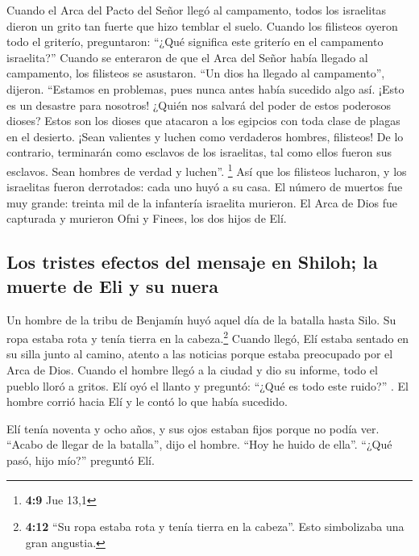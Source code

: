  Cuando el Arca del Pacto del Señor llegó al campamento,
todos los israelitas dieron un grito tan fuerte que hizo temblar el
suelo.  Cuando los filisteos oyeron todo el griterío,
preguntaron: ``¿Qué significa este griterío en el campamento
israelita?'' Cuando se enteraron de que el Arca del Señor había llegado
al campamento,  los filisteos se asustaron. ``Un dios ha
llegado al campamento'', dijeron. ``Estamos en problemas, pues nunca
antes había sucedido algo así.  ¡Esto es un desastre para
nosotros! ¿Quién nos salvará del poder de estos poderosos dioses? Estos
son los dioses que atacaron a los egipcios con toda clase de plagas en
el desierto.  ¡Sean valientes y luchen como verdaderos
hombres, filisteos! De lo contrario, terminarán como esclavos de los
israelitas, tal como ellos fueron sus esclavos. Sean hombres de verdad y
luchen''. \footnote{\textbf{4:9} Jue 13,1}  Así que los
filisteos lucharon, y los israelitas fueron derrotados: cada uno huyó a
su casa. El número de muertos fue muy grande: treinta mil de la
infantería israelita murieron.  El Arca de Dios fue
capturada y murieron Ofni y Finees, los dos hijos de Elí.

\hypertarget{los-tristes-efectos-del-mensaje-en-shiloh-la-muerte-de-eli-y-su-nuera}{%
\subsection{Los tristes efectos del mensaje en Shiloh; la muerte de Eli
y su
nuera}\label{los-tristes-efectos-del-mensaje-en-shiloh-la-muerte-de-eli-y-su-nuera}}

 Un hombre de la tribu de Benjamín huyó aquel día de la
batalla hasta Silo. Su ropa estaba rota y tenía tierra en la
cabeza.\footnote{\textbf{4:12} ``Su ropa estaba rota y tenía tierra en
  la cabeza''. Esto simbolizaba una gran angustia.} 
Cuando llegó, Elí estaba sentado en su silla junto al camino, atento a
las noticias porque estaba preocupado por el Arca de Dios. Cuando el
hombre llegó a la ciudad y dio su informe, todo el pueblo lloró a
gritos.  Elí oyó el llanto y preguntó: ``¿Qué es todo
este ruido?'' . El hombre corrió hacia Elí y le contó lo que había
sucedido.

 Elí tenía noventa y ocho años, y sus ojos estaban fijos
porque no podía ver.  ``Acabo de llegar de la batalla'',
dijo el hombre. ``Hoy he huido de ella''. ``¿Qué pasó, hijo mío?''
preguntó Elí.

